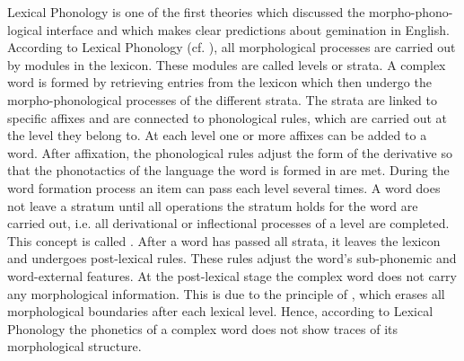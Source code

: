 Lexical Phonology is one of the first theories which discussed the morpho-phono-logical interface and which makes clear predictions about gemination in English. According to Lexical Phonology (cf. \citealt{Kiparsky.1982,Mohanan.1986}), all morphological processes are carried out by modules in the lexicon. These modules are called levels or strata. A complex word is formed by retrieving entries from the lexicon which then undergo the morpho-phonological processes of the different strata. The strata are linked to specific affixes and are connected to phonological rules, which are carried out at the level they belong to. At each level one or more affixes can be added to a word. After affixation, the phonological rules adjust the form of the derivative so that the phonotactics of the language the word is formed in are met. During the word formation process an item can pass each level several times. A word does not leave a stratum until all operations the stratum holds for the word are carried out, i.e. all derivational or inflectional processes of a level are completed. This concept is called . After a word has passed all strata, it leaves the lexicon and undergoes post-lexical rules. These rules adjust the word's sub-phonemic and word-external features. 
At the post-lexical stage the complex word does not carry any morphological information.  This is due to the principle of , which erases all morphological boundaries after each lexical level. Hence, according to Lexical Phonology the phonetics of a complex word does not show traces of its morphological structure.


